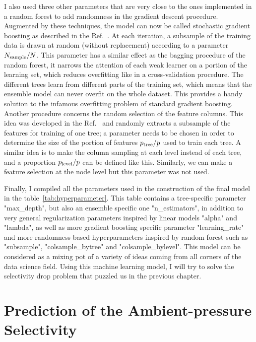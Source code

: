\documentclass[main]{subfiles}
\begin{document}
I also used three other parameters that are very close to the ones implemented in a random forest to add randomness in the gradient descent procedure. Augmented by these techniques, the model can now be called stochastic gradient boosting as described in the Ref.~\cite{Friedman2002}. At each iteration, a subsample of the training data is drawn at random (without replacement) according to a parameter $N_{\text{sample}}/N$. This parameter has a similar effect as the bagging procedure of the random forest, it narrows the attention of each weak learner on a portion of the learning set, which reduces overfitting like in a cross-validation procedure. The different trees learn from different parts of the training set, which means that the ensemble model can never overfit on the whole dataset. This provides a handy solution to the infamous overfitting problem of standard gradient boosting. Another procedure concerns the random selection of the feature columns. This idea was developed in the Ref.~\cite{Tin_Kam_Ho_1998} and randomly extracts a subsample of the features for training of one tree; a parameter needs to be chosen in order to determine the size of the portion of features $p_{\text{tree}}/p$ used to train each tree. A similar idea is to make the column sampling at each level instead of each tree, and a proportion $p_{\text{level}}/p$ can be defined like this. Similarly, we can make a feature selection at the node level but this parameter was not used. 

Finally, I compiled all the parameters used in the construction of the final model in the table~\ref{tab:hyperparameter}. This table contains a tree-specific parameter "max\_depth", but also an ensemble specific one "n\_estimators", in addition to very general regularization parameters inspired by linear models "alpha" and "lambda", as well as more gradient boosting specific parameter "learning\_rate" and more randomness-based hyperparameters inspired by random forest such as "subsample", "colsample\_bytree" and "colsample\_bylevel". This model can be considered as a mixing pot of a variety of ideas coming from all corners of the data science field. Using this machine learning model, I will try to solve the selectivity drop problem that puzzled us in the previous chapter.

\section{Prediction of the Ambient-pressure Selectivity}
\end{document}
